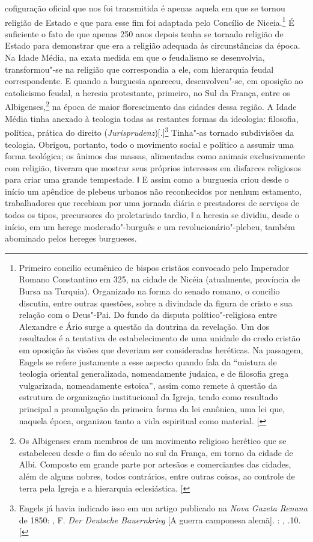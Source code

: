 cofiguração oficial que nos foi transmitida é apenas aquela em que se
tornou religião de Estado e que para esse fim foi adaptada pelo Concílio
de Niceia.\footnote{Primeiro
  concilio ecumênico de bispos cristãos convocado pelo Imperador Romano
  Constantino  em 325, na cidade de Nicéia (atualmente, província de
  Bursa na Turquia). Organizado na forma do senado romano, o concilio
  discutiu, entre outras questões, sobre a divindade da figura de cristo
  e sua relação com o Deus"-Pai. Do fundo da disputa político"-religiosa
  entre Alexandre  e Ário surge a questão da doutrina da revelação. Um
  dos resultados é a tentativa de estabelecimento de uma unidade do
  credo cristão em oposição às visões que deveriam ser consideradas
  heréticas. Na passagem, Engels se refere justamente a esse aspecto
  quando fala da ``mistura de teologia oriental generalizada,
  nomeadamente judaica, e de filosofia grega vulgarizada, nomeadamente
  estoica'', assim como remete à questão da estrutura de organização
  institucional da Igreja, tendo como resultado principal a promulgação
  da primeira forma da lei canônica, uma lei que, naquela época,
  organizou tanto a vida espiritual como material. {[}\versal{N.\,T.}{]}} É suficiente o fato
de que apenas 250 anos depois tenha se tornado religião de Estado para
demonstrar que era a religião adequada às circunstâncias da época. Na
Idade Média, na exata medida em que o feudalismo se desenvolvia,
transformou"-se na religião que correspondia a ele, com hierarquia feudal
correspondente. E quando a burguesia apareceu, desenvolveu"-se, em
oposição ao catolicismo feudal, a heresia protestante, primeiro, no Sul
da França, entre os Albigenses,\footnote{Os Albigenses
  eram membros de um movimento religioso herético que se estabeleceu
  desde o fim do século  no sul da França, em torno da cidade de
  Albi. Composto em grande parte por artesãos e comerciantes das
  cidades, além de alguns nobres, todos contrários, entre outras coisas,
  ao controle de terra pela Igreja e a hierarquia eclesiástica. {[}\versal{N.\,T.}{]}} na
época de maior florescimento das cidades dessa região. A Idade Média
tinha anexado à teologia todas as restantes formas da ideologia:
filosofia, política, prática do direito (\emph{Jurisprudenz}){[}.{]}\footnote{Engels já havia indicado isso em um artigo publicado na \emph{Nova
  Gazeta Renana} de 1850: , F. \emph{Der Deutsche Bauernkrieg}
  {[}A guerra camponesa alemã{]}. : , .10. {[}\versal{N.\,T.}{]}} Tinha"-as
tornado subdivisões da teologia. Obrigou, portanto, todo o movimento
social e político a assumir uma forma teológica; os ânimos das massas,
alimentadas como animais exclusivamente com religião, tiveram que
mostrar seus próprios interesses em disfarces religiosos para criar uma
grande tempestade. ǁ E assim como a burguesia criou desde o início um
apêndice de plebeus urbanos não reconhecidos por nenhum estamento,
trabalhadores que recebiam por uma jornada diária e prestadores de
serviços de todos os tipos, precursores do proletariado tardio, ǁ a
heresia se dividiu, desde o início, em um herege moderado"-burguês e um
revolucionário"-plebeu, também abominado pelos hereges burgueses.

